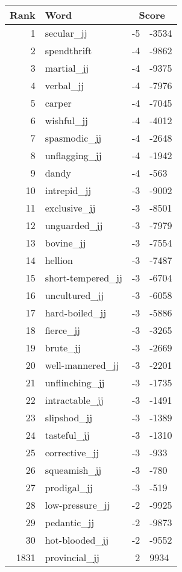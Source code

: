 \begin{longtable}[!htbp]{| rlr@{.}l |}
    \hline
    \textbf{Rank} & \textbf{Word} & \multicolumn{2}{c|}{\textbf{Score}} \\
    \hline
    \endhead
    1 & secular\_jj & -5 & -3534 \\
    2 & spendthrift & -4 & -9862 \\
    3 & martial\_jj & -4 & -9375 \\
    4 & verbal\_jj & -4 & -7976 \\
    5 & carper & -4 & -7045 \\
    6 & wishful\_jj & -4 & -4012 \\
    7 & spasmodic\_jj & -4 & -2648 \\
    8 & unflagging\_jj & -4 & -1942 \\
    9 & dandy & -4 & -563 \\
    10 & intrepid\_jj & -3 & -9002 \\
    11 & exclusive\_jj & -3 & -8501 \\
    12 & unguarded\_jj & -3 & -7979 \\
    13 & bovine\_jj & -3 & -7554 \\
    14 & hellion & -3 & -7487 \\
    15 & short-tempered\_jj & -3 & -6704 \\
    16 & uncultured\_jj & -3 & -6058 \\
    17 & hard-boiled\_jj & -3 & -5886 \\
    18 & fierce\_jj & -3 & -3265 \\
    19 & brute\_jj & -3 & -2669 \\
    20 & well-mannered\_jj & -3 & -2201 \\
    21 & unflinching\_jj & -3 & -1735 \\
    22 & intractable\_jj & -3 & -1491 \\
    23 & slipshod\_jj & -3 & -1389 \\
    24 & tasteful\_jj & -3 & -1310 \\
    25 & corrective\_jj & -3 & -933 \\
    26 & squeamish\_jj & -3 & -780 \\
    27 & prodigal\_jj & -3 & -519 \\
    28 & low-pressure\_jj & -2 & -9925 \\
    29 & pedantic\_jj & -2 & -9873 \\
    30 & hot-blooded\_jj & -2 & -9552 \\
    1831 & provincial\_jj & 2 & 9934 \\

\end{longtable}

